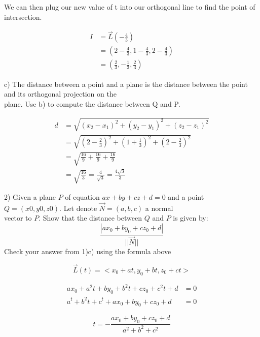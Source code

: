 \documentclass{article}
\begin{document}
\begin{text}
\indent\indent We can then plug our new value of t into our orthogonal line to find the point of intersection.
\end{text}

\begin{align*}
I &= \vec{L}(-\frac{4}{3}) \\
  &= (2 - \frac{4}{3}, 1 - \frac{4}{3}, 2 - \frac{4}{3}) \\
  &= (\frac{2}{3}, -\frac{1}{3}, \frac{2}{3})
\end{align*}

\begin{text}
\indent c) The distance between a point and a plane is the distance between the point and its orthogonal projection on the \\
\indent\indent\indent plane.  Use b) to compute the distance between Q and P.
\end{text}

\begin{align*}
d &= \sqrt{(x_2 - x_1)^2 + (y_2 - y_1)^2 + (z_2 - z_1)^2} \\
&= \sqrt{(2 - \frac{2}{3})^2 + (1 + \frac{1}{3})^2 + (2 - \frac{2}{3})^2} \\
&= \sqrt{\frac{16}{9} + \frac{16}{9} + \frac{16}{9}} \\
&= \sqrt{\frac{16}{3}} = \frac{4}{\sqrt{3}} = \frac{4\sqrt{3}}{3}
\end{align*}

\newpage

\begin{text}
2) Given a plane $P$ of equation $ax + by + cz + d = 0$ and a point $Q = (x0, y0, z0)$. Let denote $\vec{N} = (a, b, c)$ a normal \\
\indent\indent vector to $P$.  Show that the distance between $Q$ and $P$ is given by:
$$
\frac{|ax_0 + by_0 + cz_0 + d|}{||\vec{N}||}
$$
\centering
Check your answer from 1)c) using the formula above\par
\end{text}


$$
\vec{L}(t) = <x_0 + at, y_0 + bt, z_0 + ct>
$$

\begin{align*}
ax_0 + a^2t + by_0 + b^2t + cz_0 + c^2t + d &= 0 \\
a^t + b^2t + c^t + ax_0 + by_0 + cz_0 +d &= 0
\end{align*}

$$
t = -\frac{ax_0 + by_0 + cz_0 + d}{a^2 + b^2 + c^2}
$$
\end{document}

